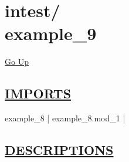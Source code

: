 \chapter*{\color{headfile}
{\large intest\slash\hspace{0pt}}
 \\
example_9
}
\hypertarget{ecldoc:toc:intest.example_9}{}
\hyperlink{ecldoc:toc:root/intest}{Go Up}

\section*{\underline{\textsf{IMPORTS}}}
\begin{doublespace}
{\large
example\_8 |
example\_8.mod\_1 |
}
\end{doublespace}

\section*{\underline{\textsf{DESCRIPTIONS}}}
